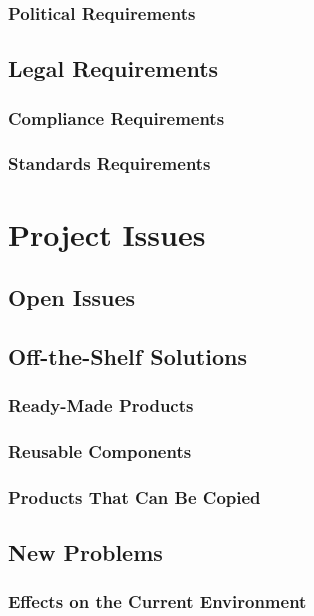 \documentclass{scrreprt}
\begin{document}
\subsection{Political Requirements}

\section{Legal Requirements}

\subsection{Compliance Requirements}

\subsection{Standards Requirements}

\chapter{Project Issues}

\section{Open Issues}

\section{Off-the-Shelf Solutions}

\subsection{Ready-Made Products}

\subsection{Reusable Components}

\subsection{Products That Can Be Copied}

\section{New Problems}

\subsection{Effects on the Current Environment}
\end{document}
